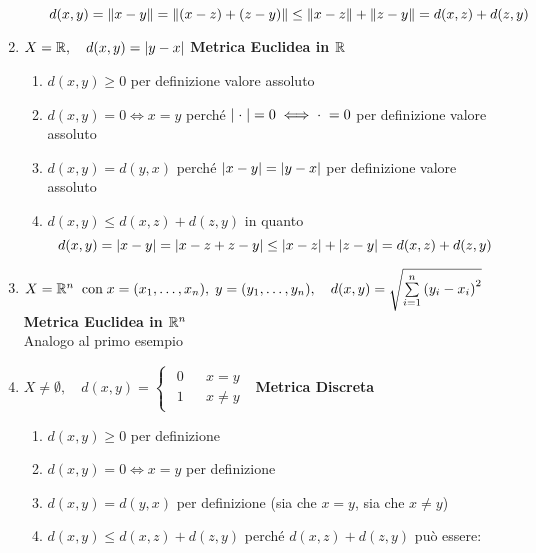 \begin{example}
\begin{enumerate}
\begin{enumerate}[label=\arabic*]
					$$d(x,y) = \left\|x-y\right\| = \left\|(x-z) + (z-y)\right\| \leq \left\|x-z\right\| + \left\|z-y\right\| = d(x,z) + d(z,y)$$
					\begin{center}
					\end{center}
			\end{enumerate}
		\item $X=\mathbb{R},\quad d(x,y)=\left|y-x\right|$ \hfill {\footnotesize\textbf{Metrica Euclidea in $\mathbb{R}$}}
			\begin{enumerate}[label=\arabic*.]
				\item $d(x,y) \geq 0$ per definizione valore assoluto
				\item $d(x,y) = 0 \iff x = y$ perché $\left|\;\cdot\;\right| = 0 \iff \cdot\; = 0$ per definizione valore assoluto
				\item $d(x,y)=d(y,x)$ perché $\left|x - y\right| = \left|y - x\right|$ per definizione valore assoluto
				\item $d(x,y) \leq d(x,z) + d(z,y)$ in quanto
					$$d(x,y) = \left|x-y\right| = \left|x-z+z-y\right| \leq \left|x-z\right| + \left|z-y\right| = d(x,z) + d(z,y)$$
			\end{enumerate}
		\item $X=\mathbb{R}^n \;\; \text{con}\; x=(x_1,\ldots,x_n),\; y=(y_1,\ldots,y_n),\quad d(x,y)=\sqrt{\sum\limits_{i=1}^{n}{\left(y_i-x_i\right)}^2}$ \hfill {\footnotesize\textbf{Metrica Euclidea in $\mathbb{R}^n$}} \label{ex:dist_eucl}\\
			Analogo al primo esempio
		\item $X\ne \emptyset,\quad d(x,y)=
			\begin{cases}
				\begin{matrix}
					0&&x=y\\
					1&&x \ne y
				\end{matrix}
			\end{cases}$ \hfill {\footnotesize\textbf{Metrica Discreta}}\label{ex:dist_discr}
			\begin{enumerate}[label=\arabic*.]
				\item $d(x,y) \geq 0$ per definizione
				\item $d(x,y) = 0 \iff x = y$ per definizione
				\item $d(x,y)=d(y,x)$ per definizione (sia che $x = y$, sia che $x \neq y$)
				\item $d(x,y) \leq d(x,z) + d(z,y)$ perché $d(x,z) + d(z,y)$ può essere:

\end{enumerate}
\end{enumerate}
\end{example}
